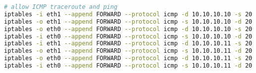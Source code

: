\documentclass[12pt, a4paper]{article}
\begin{document}
\begin{lstlisting}[language=bash]
# allow ICMP traceroute and ping
iptables -i eth1 --append FORWARD --protocol icmp -d 10.10.10.10 -s 20.20.20.0/24 --icmp-type echo-reply --jump ACCEPT
iptables -o eth1 --append FORWARD --protocol icmp -s 10.10.10.10 -d 20.20.20.0/24 --icmp-type echo-request --jump ACCEPT
iptables -o eth0 --append FORWARD --protocol icmp -d 10.10.10.10 -s 20.20.20.0/24 --icmp-type echo-reply --jump ACCEPT
iptables -i eth0 --append FORWARD --protocol icmp -s 10.10.10.10 -d 20.20.20.0/24 --icmp-type echo-request --jump ACCEPT
iptables -i eth1 --append FORWARD --protocol icmp -d 10.10.10.11 -s 20.20.20.0/24 --icmp-type echo-reply --jump ACCEPT
iptables -o eth1 --append FORWARD --protocol icmp -s 10.10.10.11 -d 20.20.20.0/24 --icmp-type echo-request --jump ACCEPT
iptables -o eth0 --append FORWARD --protocol icmp -d 10.10.10.11 -s 20.20.20.0/24 --icmp-type echo-reply --jump ACCEPT
iptables -i eth0 --append FORWARD --protocol icmp -s 10.10.10.11 -d 20.20.20.0/24 --icmp-type echo-request --jump ACCEPT
\end{lstlisting}
\end{document}
